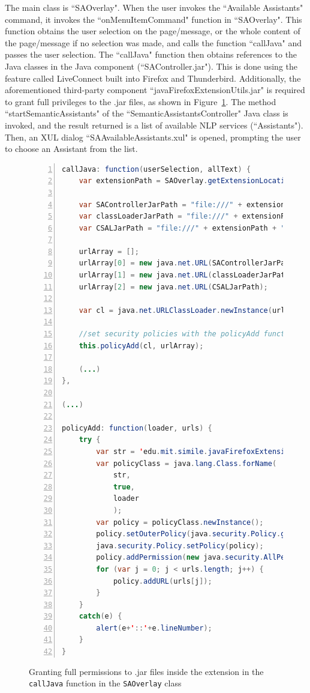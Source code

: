 The main class is ``SAOverlay". When the user invokes the ``Available Assistants" command, it invokes the ``onMenuItemCommand" function in ``SAOverlay". This function obtains the user selection on the page/message, or the whole content of the page/message if no selection was made, and calls the function ``callJava" and passes the user selection. The ``callJava" function then obtains references to the Java classes in the Java component (``SAController.jar"). This is done using the feature called LiveConnect built into Firefox and Thunderbird. Additionally, the aforementioned third-party component ``javaFirefoxExtensionUtils.jar" is required to grant full privileges to the .jar files, as shown in Figure~\ref{list:mozilla_development_notes_main_mozilla_extension_component_jar_permissions}. The method ``startSemanticAssistants" of the ``SemanticAssistantsController" Java class is invoked, and the result returned is a list of available \sa NLP services (``Assistants"). Then, an XUL dialog ``SAAvailableAssistants.xul" is opened, prompting the user to choose an Assistant from the list. 

\begin{figure}
\centering
\begin{lstlisting}[language=Java,numbers=left,xleftmargin=4mm,columns=flexible]
callJava: function(userSelection, allText) {
    var extensionPath = SAOverlay.getExtensionLocation();
    
    var SAControllerJarPath = "file:///" + extensionPath + "/java/SAController.jar"; 
    var classLoaderJarPath = "file:///" + extensionPath + "/java/javaFirefoxExtensionUtils.jar";
    var CSALJarPath = "file:///" + extensionPath + "/java/CSAL.jar";
    
    urlArray = []; 
    urlArray[0] = new java.net.URL(SAControllerJarPath); 
    urlArray[1] = new java.net.URL(classLoaderJarPath);  
    urlArray[2] = new java.net.URL(CSALJarPath);  

    var cl = java.net.URLClassLoader.newInstance(urlArray);

    //set security policies with the policyAdd function defined below
    this.policyAdd(cl, urlArray);
    
    (...)
}, 

(...)

policyAdd: function(loader, urls) {
    try {
        var str = 'edu.mit.simile.javaFirefoxExtensionUtils.URLSetPolicy';
        var policyClass = java.lang.Class.forName(
            str,
            true,
            loader
            );
        var policy = policyClass.newInstance();
        policy.setOuterPolicy(java.security.Policy.getPolicy());
        java.security.Policy.setPolicy(policy);
        policy.addPermission(new java.security.AllPermission());
        for (var j = 0; j < urls.length; j++) {
            policy.addURL(urls[j]);
        }
    }
    catch(e) {
        alert(e+'::'+e.lineNumber);
    }
}
\end{lstlisting}
\caption{Granting full permissions to .jar files inside the extension in the \texttt{callJava} function in the \texttt{SAOverlay} class}
\label{list:mozilla_development_notes_main_mozilla_extension_component_jar_permissions}
\end{figure}

